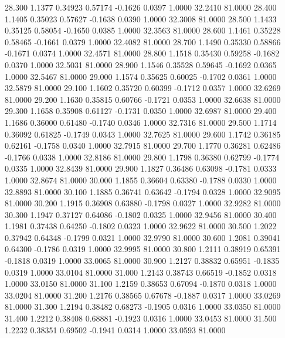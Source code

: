   28.300   1.1377   0.34923   0.57174  -0.1626   0.0397   1.0000  32.2410  81.0000
  28.400   1.1405   0.35023   0.57627  -0.1638   0.0390   1.0000  32.3008  81.0000
  28.500   1.1433   0.35125   0.58054  -0.1650   0.0385   1.0000  32.3563  81.0000
  28.600   1.1461   0.35228   0.58465  -0.1661   0.0379   1.0000  32.4082  81.0000
  28.700   1.1490   0.35330   0.58866  -0.1671   0.0374   1.0000  32.4571  81.0000
  28.800   1.1518   0.35430   0.59258  -0.1682   0.0370   1.0000  32.5031  81.0000
  28.900   1.1546   0.35528   0.59645  -0.1692   0.0365   1.0000  32.5467  81.0000
  29.000   1.1574   0.35625   0.60025  -0.1702   0.0361   1.0000  32.5879  81.0000
  29.100   1.1602   0.35720   0.60399  -0.1712   0.0357   1.0000  32.6269  81.0000
  29.200   1.1630   0.35815   0.60766  -0.1721   0.0353   1.0000  32.6638  81.0000
  29.300   1.1658   0.35908   0.61127  -0.1731   0.0350   1.0000  32.6987  81.0000
  29.400   1.1686   0.36000   0.61480  -0.1740   0.0346   1.0000  32.7316  81.0000
  29.500   1.1714   0.36092   0.61825  -0.1749   0.0343   1.0000  32.7625  81.0000
  29.600   1.1742   0.36185   0.62161  -0.1758   0.0340   1.0000  32.7915  81.0000
  29.700   1.1770   0.36281   0.62486  -0.1766   0.0338   1.0000  32.8186  81.0000
  29.800   1.1798   0.36380   0.62799  -0.1774   0.0335   1.0000  32.8439  81.0000
  29.900   1.1827   0.36486   0.63098  -0.1781   0.0333   1.0000  32.8674  81.0000
  30.000   1.1855   0.36604   0.63380  -0.1788   0.0330   1.0000  32.8893  81.0000
  30.100   1.1885   0.36741   0.63642  -0.1794   0.0328   1.0000  32.9095  81.0000
  30.200   1.1915   0.36908   0.63880  -0.1798   0.0327   1.0000  32.9282  81.0000
  30.300   1.1947   0.37127   0.64086  -0.1802   0.0325   1.0000  32.9456  81.0000
  30.400   1.1981   0.37438   0.64250  -0.1802   0.0323   1.0000  32.9622  81.0000
  30.500   1.2022   0.37942   0.64348  -0.1799   0.0321   1.0000  32.9790  81.0000
  30.600   1.2081   0.39041   0.64300  -0.1786   0.0319   1.0000  32.9995  81.0000
  30.800   1.2111   0.38919   0.65391  -0.1818   0.0319   1.0000  33.0065  81.0000
  30.900   1.2127   0.38832   0.65951  -0.1835   0.0319   1.0000  33.0104  81.0000
  31.000   1.2143   0.38743   0.66519  -0.1852   0.0318   1.0000  33.0150  81.0000
  31.100   1.2159   0.38653   0.67094  -0.1870   0.0318   1.0000  33.0204  81.0000
  31.200   1.2176   0.38565   0.67678  -0.1887   0.0317   1.0000  33.0269  81.0000
  31.300   1.2194   0.38482   0.68273  -0.1905   0.0316   1.0000  33.0350  81.0000
  31.400   1.2212   0.38408   0.68881  -0.1923   0.0316   1.0000  33.0453  81.0000
  31.500   1.2232   0.38351   0.69502  -0.1941   0.0314   1.0000  33.0593  81.0000
